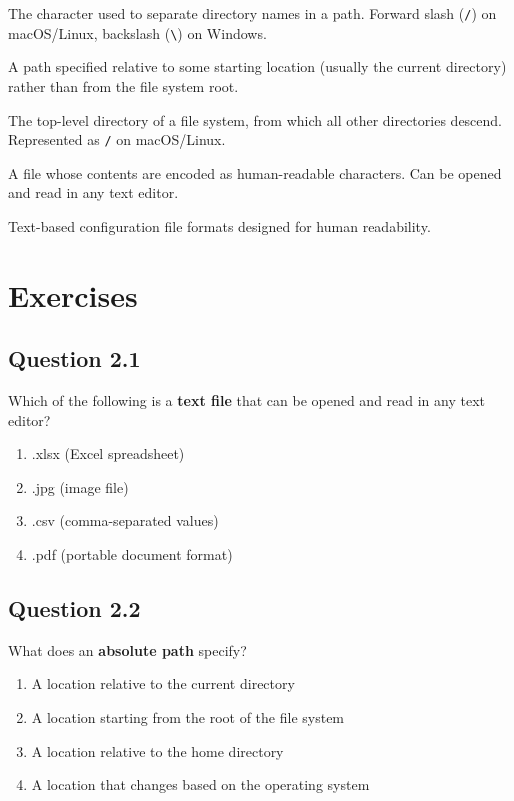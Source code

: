 \documentclass[
  letterpaper,
  DIV=11,
  numbers=noendperiod]{scrreprt}
\providecommand{\tightlist}{%
  \setlength{\itemsep}{0pt}\setlength{\parskip}{0pt}}
\begin{document}
\begin{description}
The character used to separate directory names in a path. Forward slash
(\texttt{/}) on macOS/Linux, backslash (\texttt{\textbackslash{}}) on
Windows.
\item[\textbf{Relative path}]
A path specified relative to some starting location (usually the current
directory) rather than from the file system root.
\item[\textbf{Root directory}]
The top-level directory of a file system, from which all other
directories descend. Represented as \texttt{/} on macOS/Linux.
\item[\textbf{Text file}]
A file whose contents are encoded as human-readable characters. Can be
opened and read in any text editor.
\item[\textbf{YAML/TOML}]
Text-based configuration file formats designed for human readability.
\end{description}

\section{Exercises}\label{exercises-1}

\subsection{Question 2.1}\label{question-2.1}

Which of the following is a \textbf{text file} that can be opened and
read in any text editor?

\begin{enumerate}
\def\labelenumi{\Alph{enumi})}
\tightlist
\item
  .xlsx (Excel spreadsheet)\\
\item
  .jpg (image file)\\
\item
  .csv (comma-separated values)\\
\item
  .pdf (portable document format)
\end{enumerate}

\subsection{Question 2.2}\label{question-2.2}

What does an \textbf{absolute path} specify?

\begin{enumerate}
\def\labelenumi{\Alph{enumi})}
\tightlist
\item
  A location relative to the current directory\\
\item
  A location starting from the root of the file system\\
\item
  A location relative to the home directory\\
\item
  A location that changes based on the operating system
\end{enumerate}
\end{document}
